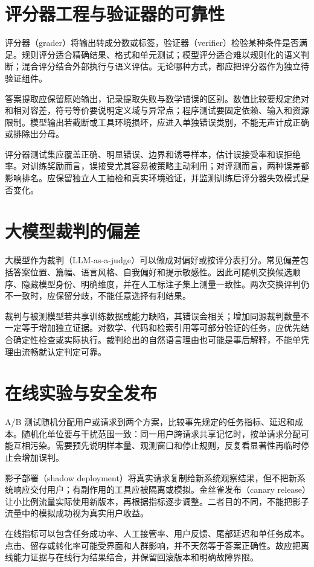 \section{评分器工程与验证器的可靠性}

评分器（grader）将输出转成分数或标签，验证器（verifier）检验某种条件是否满足。规则评分适合精确结果、格式和单元测试；模型评分适合难以规则化的语义判断；混合评分结合外部执行与语义评估。无论哪种方式，都应把评分器作为独立待验证组件。

答案提取应保留原始输出，记录提取失败与数学错误的区别。数值比较要规定绝对和相对容差，符号等价要说明定义域与异常点；程序测试要固定依赖、输入和资源限制。模型输出若截断或工具环境损坏，应进入单独错误类别，不能无声计成正确或排除出分母。

评分器测试集应覆盖正确、明显错误、边界和诱导样本，估计误接受率和误拒绝率。对训练奖励而言，误接受尤其容易被策略主动利用；对评测而言，两种误差都影响排名。应保留独立人工抽检和真实环境验证，并监测训练后评分器失效模式是否变化。

\section{大模型裁判的偏差}

大模型作为裁判（LLM-as-a-judge）可以做成对偏好或按评分表打分。常见偏差包括答案位置、篇幅、语言风格、自我偏好和提示敏感性\cite{judge}。因此可随机交换候选顺序、隐藏模型身份、明确维度，并在人工标注子集上测量一致性。两次交换评判仍不一致时，应保留分歧，不能任意选择有利结果。

裁判与被测模型若共享训练数据或能力缺陷，其错误会相关；增加同源裁判数量不一定等于增加独立证据。对数学、代码和检索引用等可部分验证的任务，应优先结合确定性检查或实际执行。裁判给出的自然语言理由也可能是事后解释，不能单凭理由流畅就认定判定可靠。

\section{在线实验与安全发布}

A/B 测试随机分配用户或请求到两个方案，比较事先规定的任务指标、延迟和成本。随机化单位要与干扰范围一致：同一用户跨请求共享记忆时，按单请求分配可能互相污染。需要预先说明样本量、观测窗口和停止规则，反复看显著性再临时停止会增加误判。

影子部署（shadow deployment）将真实请求复制给新系统观察结果，但不把新系统响应交付用户；有副作用的工具应被隔离或模拟。金丝雀发布（canary release）让小比例流量实际使用新版本，再根据指标逐步调整。二者目的不同，不能把影子流量中的模拟成功视为真实用户收益。

在线指标可以包含任务成功率、人工接管率、用户反馈、尾部延迟和单任务成本。点击、留存或转化率可能受界面和人群影响，并不天然等于答案正确性。故应把离线能力证据与在线行为结果结合，并保留回滚版本和明确故障界限。

